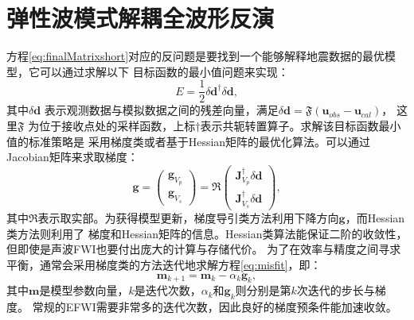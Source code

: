 \section{弹性波模式解耦全波形反演}
方程\eqref{eq:finalMatrixshort}对应的反问题是要找到一个能够解释地震数据的最优模型，它可以通过求解以下
目标函数的最小值问题来实现：
\begin{equation}
    E=\frac{1}{2}\delta\mathbf{d}^{\dagger}\delta\mathbf{d},
    \label{eq:misfit}
\end{equation}
其中$\delta\mathbf{d}$ 表示观测数据与模拟数据之间的残差向量，满足$\delta\mathbf{d}=\mathfrak{F}(\mathbf{u}_{obs}-\mathbf{u}_{cal})$，
这里$\mathfrak{F}$ 为位于接收点处的采样函数，上标$\dagger$表示共轭转置算子。求解该目标函数最小值的标准策略是
采用梯度类或者基于Hessian矩阵的最优化算法。可以通过Jacobian矩阵来求取梯度：
\begin{equation}
        \mathbf{g}=
        \begin{pmatrix}
                \mathbf{g}_{V_p}\\
                \mathbf{g}_{V_s}
        \end{pmatrix}
        =\mathfrak{R}\begin{pmatrix}
                \mathbf{J}^{\dagger}_{V_p}\delta \mathbf{d}\\
                \mathbf{J}^{\dagger}_{V_s}\delta \mathbf{d}
        \end{pmatrix},
        \label{eq:MatrixGra1}
\end{equation}
其中$\mathfrak{R}$表示取实部。为获得模型更新，梯度导引类方法利用下降方向$\mathbf{g}$，而Hessian类方法则利用了
梯度和Hessian矩阵的信息。Hessian类算法能保证二阶的收敛性，但即使是声波FWI也要付出庞大的计算与存储代价。
为了在效率与精度之间寻求平衡，通常会采用梯度类的方法迭代地求解方程\eqref{eq:misfit}，即：
\begin{equation}
        \mathbf{m}_{k+1}=\mathbf{m}_{k}-\alpha_k \mathbf{g}_k,
        \label{eq:Gradientmethod1}
\end{equation}
其中$\mathbf{m}$是模型参数向量，$k$是迭代次数，$\alpha_k$和$\mathbf{g}_k$则分别是第$k$次迭代的步长与梯度。
常规的EFWI需要非常多的迭代次数，因此良好的梯度预条件能加速收敛。


